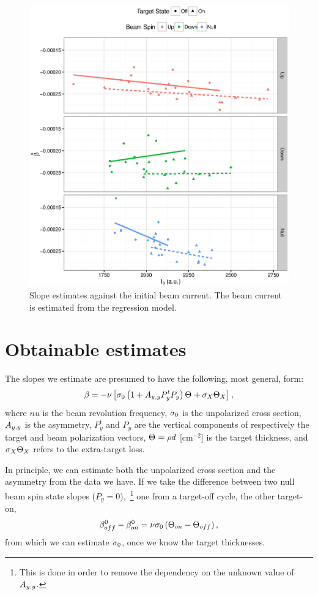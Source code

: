 \documentclass{report}
\begin{document}
\begin{figure}
	\centering
	\includegraphics{Slope_VS_IniCurrent_2016.eps}
	\caption{Slope estimates against the initial beam current. The beam current is estimated from the regression model.\label{fig:Slp_VS_I0}}
\end{figure}

\section{Obtainable estimates}

The slopes we estimate are presumed to have the following, most general, form:
\begin{equation}
	\slp = -\nu\bkt*{\CS[0]\bkt{1 + \Ayy P^t_y P_y}\Thick + \CS[X]\Thick[X]},
\end{equation}
where $nu$ is the beam revolution frequency, $\CS[0]$ is the unpolarized cross section, $\Ayy$ is the asymmetry, $P^t_y$ and $P_y$ are the vertical components of respectively the target and beam polarization vectors, $\Thick = \rho d$ [cm$^{-2}$] is the target thickness, and $\CS[X]\Thick[X]$ refers to the extra-target loss.

In principle, we can estimate both the unpolarized cross section and the asymmetry from the data we have. If we take the difference between two null beam spin state slopes ($P_y = 0$),~\footnote{This is done in order to remove the dependency on the unknown value of $\Ayy$.} one from a target-off cycle, the other target-on, 
\[
	\slp[off]^0 - \slp[on]^0 = \nu\CS[0]\bkt{\Thick[on]-\Thick[off]},
\]
from which we can estimate $\CS[0]$, once we know the target thicknesses.
\end{document}

